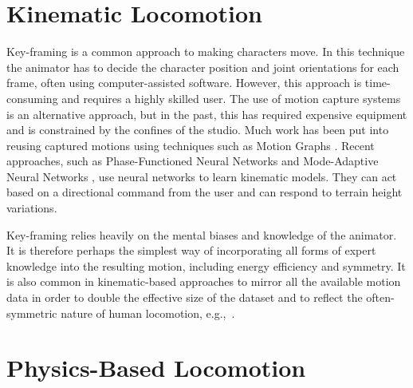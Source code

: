 \section{Kinematic Locomotion}

Key-framing is a common approach to making characters move. In this technique the animator has to decide the character position and joint orientations for each frame, often using computer-assisted software. However, this approach is time-consuming and requires a highly skilled user. The use of motion capture systems is an alternative approach, but in the past, this has required expensive equipment and is constrained by the confines of the studio. Much work has been put into reusing captured motions using techniques such as Motion Graphs \cite{Kovar:2002:MG:566570.566605}. Recent approaches, such as Phase-Functioned Neural Networks  \cite{PFNN} and Mode-Adaptive Neural Networks \cite{MANN}, use neural networks to learn kinematic models. They can act based on a directional command from the user and can respond to terrain height variations.

Key-framing relies heavily on the mental biases and knowledge of the animator. It is therefore perhaps the simplest way of incorporating all forms of expert knowledge into the resulting motion, including energy efficiency and symmetry.
It is also common in kinematic-based approaches to mirror all the available motion data in order to double the effective size of the dataset and to reflect the often-symmetric nature of human locomotion, e.g.,~\cite{bruderlin,HoldenPFNN}.




\section{Physics-Based Locomotion}

